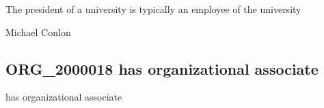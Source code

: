 \documentclass[letterpaper,10pt,english]{sphinxmanual}
\begin{document}
\begin{sphinxShadowBox}

\sphinxAtStartPar
{\hyperref[\detokenize{doc-ORG_0000001::doc}]{}}
\end{sphinxShadowBox}

\begin{sphinxShadowBox}

\sphinxAtStartPar
The president of a university is typically an employee of the university
\end{sphinxShadowBox}

\begin{sphinxShadowBox}

\sphinxAtStartPar
{}
\end{sphinxShadowBox}

\begin{sphinxShadowBox}

\sphinxAtStartPar
Michael Conlon 
\end{sphinxShadowBox}
\begin{quote}

\ignorespaces \end{quote}


\subsection{ORG\_2000018 \sphinxhyphen{} has organizational associate}
\label{\detokenize{doc-ORG_2000018:org-2000018-has-organizational-associate}}\label{\detokenize{doc-ORG_2000018:index-0}}\label{\detokenize{doc-ORG_2000018::doc}}
\begin{sphinxShadowBox}

\sphinxAtStartPar
has organizational associate
\end{sphinxShadowBox}

\begin{sphinxShadowBox}

\sphinxAtStartPar
{}
\end{sphinxShadowBox}
\end{document}
